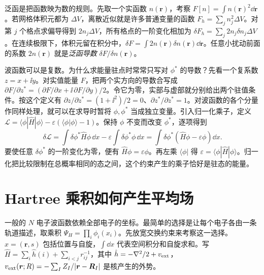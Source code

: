 泛函是把函数映为数的规则。先取一个实函数 $n(\bm r)$，考察 $F[n]=\int n(\bm r)^2\dd\bm r$。若网格体积元都为 $\Delta V$，离散近似就是许多普通变量的函数 $F_h=\sum_j n_j^2\Delta V$。对第 $j$ 个格点求偏导得到 $2n_j\Delta V$，所有格点的一阶变化相加为 $\delta F_h=\sum_j 2n_j\delta n_j\Delta V$。在连续极限下，体积元留在积分中，$\delta F=\int 2n(\bm r)\delta n(\bm r)\dd\bm r$。任意小扰动前面的系数 $2n(\bm r)$ 就是\emph{泛函导数} $\delta F/\delta n(\bm r)$。

波函数可以是复数。为什么求能量驻点时常常只写对 $\phi^*$ 的导数？先看一个复系数 $z=x+\ii y$。对实值能量 $F$，把两个实方向的导数合写成 $\partial F/\partial z^*=(\partial F/\partial x+\ii\,\partial F/\partial y)/2$。令它为零，实部与虚部就分别给出两个驻值条件。按这个定义有 $\partial z/\partial z^*=(1+\ii^2)/2=0$、$\partial z^*/\partial z^*=1$。对波函数的各个分量作同样处理，就可以在求导时暂将 $\phi,\phi^*$ 当成独立变量。引入归一化乘子，定义 $\mathcal L=\langle\phi|\hat H|\phi\rangle-\varepsilon(\langle\phi|\phi\rangle-1)$。保持 $\phi$ 不变而改变 $\phi^*$，逐项得到
\begin{equation}
\delta\mathcal L=\int\delta\phi^*\hat H\phi\,\dd x
-\varepsilon\int\delta\phi^*\phi\,\dd x
=\int\delta\phi^*(\hat H\phi-\varepsilon\phi)\dd x.
\end{equation}
要使任意 $\delta\phi^*$ 的一阶变化为零，便有 $\hat H\phi=\varepsilon\phi$。再左乘 $\langle\phi|$ 得 $\varepsilon=\langle\phi|\hat H|\phi\rangle$。归一化把比较限制在总概率相同的态之间，这个约束产生的乘子恰好是驻态的能量。

\section{Hartree 乘积如何产生平均场}
一般的 $N$ 电子波函数依赖全部电子的坐标。最简单的选择是让每个电子各由一条轨道描述，取乘积 $\Psi_H=\prod_i\phi_i(x_i)$。先放宽交换约束来考察这一选择。$x=(\bm r,s)$ 包括位置与自旋，$\int\dd x$ 代表空间积分和自旋求和。写 $\hat H=\sum_i\hat h(i)+\sum_{i<j}r_{ij}^{-1}$，其中 $\hat h=-\nabla^2/2+v_{\rm ext}$，$v_{\rm ext}(\bm r;R)=-\sum_I Z_I/|\bm r-\bm R_I|$ 是核产生的外势。

